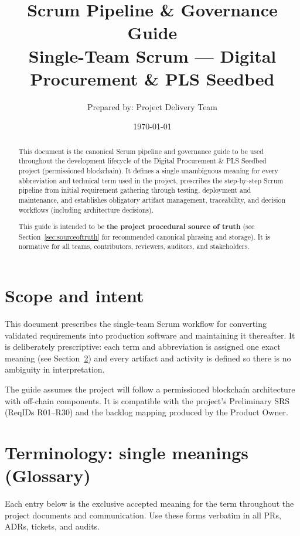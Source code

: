 \documentclass[11pt,a4paper]{article}
\title{Scrum Pipeline \& Governance Guide\\
\large Single-Team Scrum — Digital Procurement \& PLS Seedbed}
\author{Prepared by: Project Delivery Team}
\date{\today}
\begin{document}
\maketitle

\begin{abstract}
This document is the canonical Scrum pipeline and governance guide to be used throughout the development lifecycle of the Digital Procurement \& PLS Seedbed project (permissioned blockchain).  
It defines a single unambiguous meaning for every abbreviation and technical term used in the project, prescribes the step-by-step Scrum pipeline from initial requirement gathering through testing, deployment and maintenance, and establishes obligatory artifact management, traceability, and decision workflows (including architecture decisions).  

This guide is intended to be \textbf{the project procedural source of truth} (see Section~\ref{sec:sourceoftruth} for recommended canonical phrasing and storage). It is normative for all teams, contributors, reviewers, auditors, and stakeholders.
\end{abstract}

\tableofcontents
\clearpage

\section{Scope and intent}
This document prescribes the single-team Scrum workflow for converting validated requirements into production software and maintaining it thereafter. It is deliberately prescriptive: each term and abbreviation is assigned one exact meaning (see Section~\ref{sec:glossary}) and every artifact and activity is defined so there is no ambiguity in interpretation.

The guide assumes the project will follow a permissioned blockchain architecture with off-chain components. It is compatible with the project's Preliminary SRS (ReqIDs R01--R30) and the backlog mapping produced by the Product Owner.

\section{Terminology: single meanings (Glossary)}\label{sec:glossary}
Each entry below is the exclusive accepted meaning for the term throughout the project documents and communication. Use these forms verbatim in all PRs, ADRs, tickets, and audits.
\end{document}
